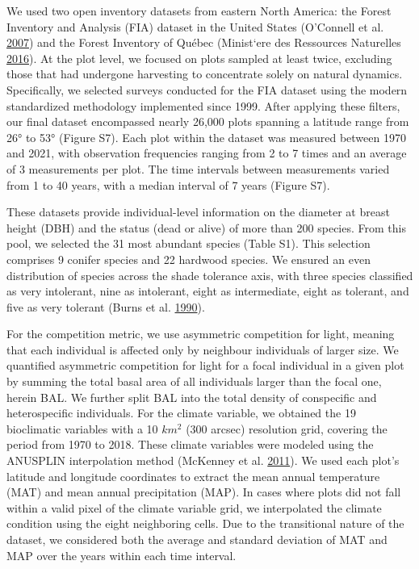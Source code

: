 \documentclass[12pt]{article}
\begin{document}
We used two open inventory datasets from eastern North America: the
Forest Inventory and Analysis (FIA) dataset in the United States
(O'Connell et al. \protect\hyperlink{ref-OConnell2007}{2007}) and the
Forest Inventory of Québec (Minist\a`ere des Ressources Naturelles
\protect\hyperlink{ref-Naturelles2016}{2016}). At the plot level, we
focused on plots sampled at least twice, excluding those that had
undergone harvesting to concentrate solely on natural dynamics.
Specifically, we selected surveys conducted for the FIA dataset using
the modern standardized methodology implemented since 1999. After
applying these filters, our final dataset encompassed nearly 26,000
plots spanning a latitude range from 26° to 53° (Figure S7). Each plot
within the dataset was measured between 1970 and 2021, with observation
frequencies ranging from 2 to 7 times and an average of 3 measurements
per plot. The time intervals between measurements varied from 1 to 40
years, with a median interval of 7 years (Figure S7).

These datasets provide individual-level information on the diameter at
breast height (DBH) and the status (dead or alive) of more than 200
species. From this pool, we selected the 31 most abundant species (Table
S1). This selection comprises 9 conifer species and 22 hardwood species.
We ensured an even distribution of species across the shade tolerance
axis, with three species classified as very intolerant, nine as
intolerant, eight as intermediate, eight as tolerant, and five as very
tolerant (Burns et al. \protect\hyperlink{ref-burns1990silvics}{1990}).

For the competition metric, we use asymmetric competition for light,
meaning that each individual is affected only by neighbour individuals
of larger size. We quantified asymmetric competition for light for a
focal individual in a given plot by summing the total basal area of all
individuals larger than the focal one, herein BAL. We further split BAL
into the total density of conspecific and heterospecific individuals.
For the climate variable, we obtained the 19 bioclimatic variables with
a 10 \(km^2\) (300 arcsec) resolution grid, covering the period from
1970 to 2018. These climate variables were modeled using the ANUSPLIN
interpolation method (McKenney et al.
\protect\hyperlink{ref-McKenney2011}{2011}). We used each plot's
latitude and longitude coordinates to extract the mean annual
temperature (MAT) and mean annual precipitation (MAP). In cases where
plots did not fall within a valid pixel of the climate variable grid, we
interpolated the climate condition using the eight neighboring cells.
Due to the transitional nature of the dataset, we considered both the
average and standard deviation of MAT and MAP over the years within each
time interval.
\end{document}
